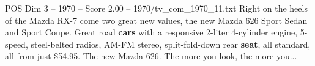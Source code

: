 \begin{textsample}{POS Dim 3 – 1970 – Score 2.00 – 1970/tv\_com\_1970\_11.txt}  \label{ex:f3_pos_037}
Right on the heels of the Mazda RX-7 come two great new values, the new Mazda 626 Sport Sedan and Sport Coupe.
Great road \textbf{cars} with a responsive 2-liter 4-cylinder engine, 5-speed, steel-belted radios, AM-FM stereo, split-fold-down rear \textbf{seat}, all standard, all from just \$54.95.
The new Mazda 626.
The more you look, the more you...

\end{textsample}

